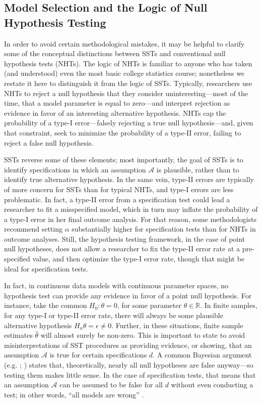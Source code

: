 \documentclass[12pt]{article}\usepackage[]{graphicx}\usepackage[]{color}
\begin{document}
\subsection{Model Selection and the Logic of Null Hypothesis Testing}
In order to avoid certain methodological mistakes, it may be helpful to
clarify some of the conceptual distinctions between SSTs and
conventional null hypothesis tests (NHTs).
The logic of NHTs is familiar to anyone who has taken (and understood)
even the most basic college statistics course; nonetheless we restate
it here to distinguish it from the logic of SSTs.
Typically, researchers use NHTs to reject a null hypothesis that they
consider uninteresting---most of the time, that a model parameter is
equal to zero---and interpret rejection as evidence in favor of an
interesting alternative hypothesis.
NHTs cap the probability of a type-I error---falsely rejecting a true
null hypothesis---and, given that constraint, seek to minimize the
probability of a type-II error, failing to reject a false null
hypothesis.

SSTs reverse some of these elements; most importantly, the goal of
SSTs is to identify specifications in which an assumption
$\mathcal{A}$ is plausible, rather than to identify true alternative
hypothesis.
In the same vein, type-II errors are typically of more concern for
SSTs than for typical NHTs, and type-I errors are less problematic.
In fact, a type-II error from a specification test could lead a
researcher to fit a misspecified model, which in turn may inflate the
probability of a type-I error in her final outcome analysis.
For that reason, some methodologists recommend setting $\alpha$
substantially higher for specification tests than for NHTs in outcome
analyses.
Still, the hypothesis testing framework, in the case of point null
hypotheses, does not allow a researcher to
fix the type-II error rate at a pre-specified value, and then optimize
the type-I error rate, though that might be ideal for
specification tests.

In fact, in continuous data models with continuous parameter spaces,
no hypothesis test can provide any evidence in favor of a point null
hypothesis.
For instance, take the common $H_0: \theta=0$, for some parameter
$\theta\in \mathbb{R}$.
In finite samples, for any type-I or type-II error rate, there will
always be some plausible alternative hypothesis $H_a
\theta=\epsilon\ne 0$.
Further, in these situations, finite sample estimates $\hat{\theta}$
will almost surely be non-zero.
This is important to state to avoid misinterpretations of SST
procedures as providing evidence, or showing, that an assumption
$\mathcal{A}$ is true for certain specifications $d$.
A common Bayesian argument (e.g. \citealp[][p. 439]{kadanePrinciples};
\citealp{gelmanBlog}) states that, theoretically, nearly all null
hypotheses are false anyway---so testing them makes little sense.
In the case of specification tests, that means that an assumption
$\mathcal{A}$ can be assumed to be false for all $d$ without even
conducting a test; in other words, ``all models are wrong''
\citep[p. 2]{modelsWrong}.
\end{document}
